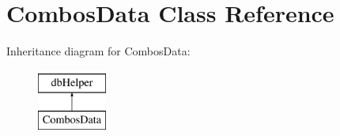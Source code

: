 \hypertarget{class_combos_data}{\section{\-Combos\-Data \-Class \-Reference}
\label{class_combos_data}
}
\-Inheritance diagram for \-Combos\-Data\-:\begin{figure}[H]
\begin{center}
\leavevmode
\includegraphics[height=2.000000cm]{class_combos_data}
\end{center}
\end{figure}
